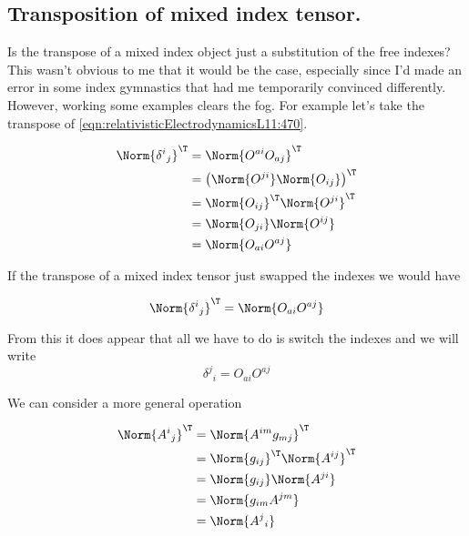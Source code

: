 \subsection{Transposition of mixed index tensor.}

Is the transpose of a mixed index object just a substitution of the free indexes?  This wasn't obvious to me that it would be the case, especially since I'd made an error in some index gymnastics that had me temporarily convinced differently.  However, working some examples clears the fog.  For example let's take the transpose of \ref{eqn:relativisticElectrodynamicsL11:470}.  

\begin{align*}
\Norm{ {\delta^i}_j }^\T 
&= 
\Norm{ O^{a i} O_{a j} }^\T \\
&= 
\left( \Norm{ O^{j i} } \Norm{ O_{i j} } \right)^\T \\
&=
\Norm{ O_{i j} }^\T
\Norm{ O^{j i} }^\T  \\
&=
\Norm{ O_{j i} }
\Norm{ O^{i j} } \\
&=
\Norm{ O_{a i} O^{a j} } \\
\end{align*}

If the transpose of a mixed index tensor just swapped the indexes we would have

\begin{equation}\label{eqn:relativisticElectrodynamicsL11:1060}
\Norm{ {\delta^i}_j }^\T = \Norm{ O_{a i} O^{a j} } 
\end{equation}

From this it does appear that all we have to do is switch the indexes and we will write
\begin{equation}\label{eqn:relativisticElectrodynamicsL11:1060b}
{\delta^j}_i = O_{a i} O^{a j} 
\end{equation}

We can consider a more general operation

\begin{align*}
\Norm{{A^i}_j}^\T
&=
\Norm{ A^{i m} g_{m j} }^\T \\
&=
\Norm{ g_{i j} }^\T
\Norm{ A^{i j} }^\T 
 \\
&=
\Norm{ g_{i j} }
\Norm{ A^{j i} }
 \\
&=
\Norm{ g_{i m} A^{j m} }
 \\
&=
\Norm{ {A^{j}}_i }
\end{align*}

